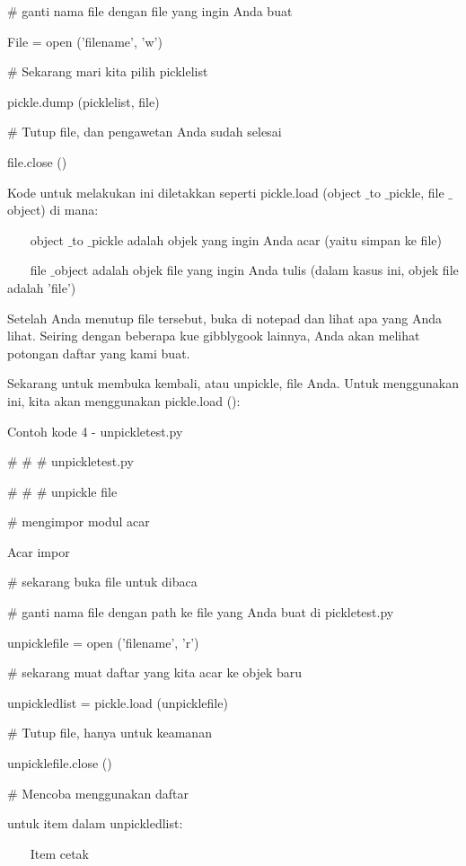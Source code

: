  $  \#  $ ganti nama file dengan file yang ingin Anda buat \par
File = open ('filename', 'w') \par
\vspace{12pt}
 $  \#  $ Sekarang mari kita pilih picklelist \par
pickle.dump (picklelist, file) \par
\vspace{12pt}
 $  \#  $ Tutup file, dan pengawetan Anda sudah selesai \par
file.close () \par
\vspace{12pt}
Kode untuk melakukan ini diletakkan seperti pickle.load (object $  \_  $to $  \_  $pickle, file $  \_  $object) di mana: \par
\vspace{12pt}
~~~ object $  \_  $to $  \_  $pickle adalah objek yang ingin Anda acar (yaitu simpan ke file) \par
~~~ file $  \_  $object adalah objek file yang ingin Anda tulis (dalam kasus ini, objek file adalah 'file') \par
\vspace{12pt}
Setelah Anda menutup file tersebut, buka di notepad dan lihat apa yang Anda lihat. Seiring dengan beberapa kue gibblygook lainnya, Anda akan melihat potongan daftar yang kami buat. \par
\vspace{12pt}
Sekarang untuk membuka kembali, atau unpickle, file Anda. Untuk menggunakan ini, kita akan menggunakan pickle.load (): \par
Contoh kode 4 - unpickletest.py \par
\vspace{12pt}
 $  \#  $ $  \#  $ $  \#  $ unpickletest.py \par
 $  \#  $ $  \#  $ $  \#  $ unpickle file \par
\vspace{12pt}
 $  \#  $ mengimpor modul acar \par
Acar impor \par
\vspace{12pt}
 $  \#  $ sekarang buka file untuk dibaca \par
 $  \#  $ ganti nama file dengan path ke file yang Anda buat di pickletest.py \par
unpicklefile = open ('filename', 'r') \par
\vspace{12pt}
 $  \#  $ sekarang muat daftar yang kita acar ke objek baru \par
unpickledlist = pickle.load (unpicklefile) \par
\vspace{12pt}
 $  \#  $ Tutup file, hanya untuk keamanan \par
unpicklefile.close () \par
\vspace{12pt}
 $  \#  $ Mencoba menggunakan daftar \par
untuk item dalam unpickledlist: \par
~~~ Item cetak \par
\vspace{12pt}

